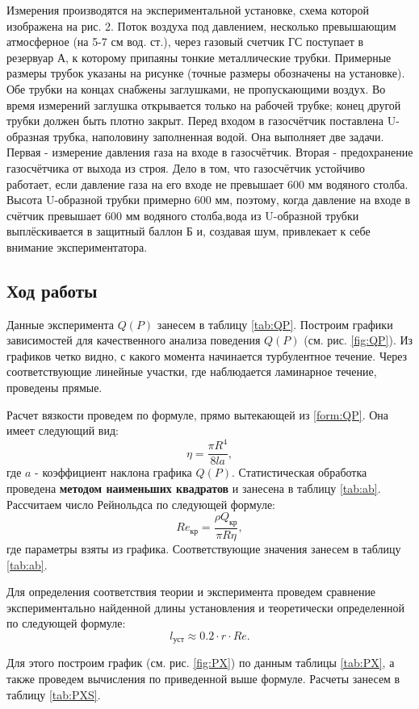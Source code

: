 \documentclass[12pt,a4paper]{article}
\begin{document}
	Измерения производятся на экспериментальной установке, схема которой изображена на рис. 2. Поток воздуха под давлением, несколько превышающим атмосферное (на 5-7 см вод. ст.), через газовый счетчик ГС поступает в резервуар А, к которому припаяны тонкие металлические трубки. Примерные размеры трубок указаны на рисунке (точные размеры обозначены на установке). Обе трубки на концах снабжены заглушками, не пропускающими воздух. Во время измерений заглушка открывается только на рабочей трубке; конец другой трубки должен быть плотно закрыт. Перед входом в газосчётчик поставлена U-образная трубка, наполовину заполненная водой. Она выполняет две задачи. Первая - измерение давления газа на входе в газосчётчик. Вторая - предохранение газосчётчика от выхода из строя. Дело в том, что газосчётчик устойчиво работает, если давление газа на его входе не превышает 600 мм водяного столба. Высота U-образной трубки примерно 600 мм, поэтому, когда давление на входе в счётчик превышает 600 мм водяного столба,вода из U-образной трубки выплёскивается в защитный баллон Б и, создавая шум, привлекает к себе внимание экспериментатора. 


\subsection*{Ход работы}



Данные эксперимента $Q(P)$ занесем в таблицу \ref{tab:QP}. Построим графики зависимостей для качественного анализа поведения $Q(P)$ (см. рис. \ref{fig:QP}).
Из графиков четко видно, с какого момента начинается турбулентное течение. Через соответствующие линейные участки, где наблюдается ламинарное течение, проведены прямые.

Расчет вязкости проведем по формуле, прямо вытекающей из \ref{form:QP}. Она имеет следующий вид:
$$\eta = \frac{\pi R^4}{8la},$$
где $a$ - коэффициент наклона графика $Q(P)$.
Статистическая обработка проведена \textbf{методом наименьших квадратов} и занесена в таблицу \ref{tab:ab}.
Рассчитаем число Рейнольдса по следующей формуле:
$$Re_{\text{кр}} = \frac{\rho Q_{\text{кр}}}{\pi R \eta},$$
где параметры взяты из графика. Соответствующие значения занесем в таблицу \ref{tab:ab}.

Для определения соответствия теории и эксперимента проведем сравнение экспериментально найденной длины установления и теоретически определенной по следующей формуле:
$$l_{\text{уст}} \approx  0.2 \cdot r \cdot Re.$$

Для этого построим график (см. рис. \ref{fig:PX}) по данным таблицы \ref{tab:PX}, а также проведем вычисления по приведенной выше формуле. Расчеты занесем в таблицу \ref{tab:PXS}.
\end{document}

